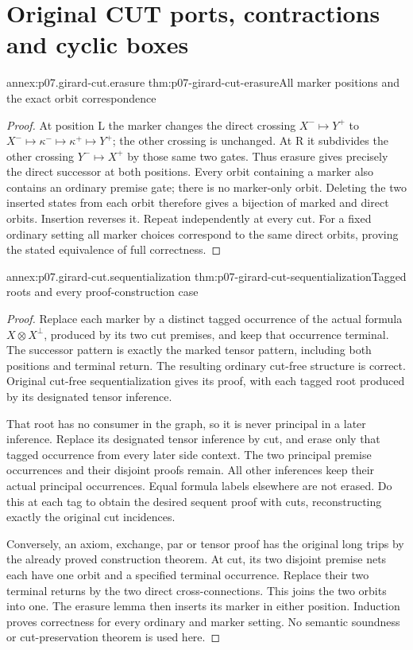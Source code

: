 \section{Original CUT ports, contractions and cyclic boxes}

\begin{annexitem}{annex:p07.girard-cut.erasure}
 {thm:p07-girard-cut-erasure}{All marker positions and the exact orbit correspondence}
\begin{proof}
At position L the marker changes the direct crossing \(X^-\mapsto Y^+\)
to \(X^-\mapsto\kappa^-\mapsto\kappa^+\mapsto Y^+\);
the other crossing is unchanged. At R it subdivides the other crossing
\(Y^-\mapsto X^+\) by those same two gates.
Thus erasure gives precisely the direct successor at both positions.
Every orbit containing a marker also contains an ordinary premise gate;
there is no marker-only orbit. Deleting the two inserted states from
each orbit therefore gives a bijection of marked and direct orbits.
Insertion reverses it. Repeat independently at every cut.
For a fixed ordinary setting all marker choices correspond to the
same direct orbits, proving the stated equivalence of full correctness.
\end{proof}
\end{annexitem}

\begin{annexitem}{annex:p07.girard-cut.sequentialization}
 {thm:p07-girard-cut-sequentialization}{Tagged roots and every proof-construction case}
\begin{proof}
Replace each marker by a distinct tagged occurrence of the actual
formula \(X\otimes X^\perp\), produced by its two cut premises,
and keep that occurrence terminal. The successor pattern is exactly
the marked tensor pattern, including both positions and terminal return.
The resulting ordinary cut-free structure is correct.
Original cut-free sequentialization gives its proof, with each tagged
root produced by its designated tensor inference.

That root has no consumer in the graph, so it is never principal in
a later inference. Replace its designated tensor inference by cut,
and erase only that tagged occurrence from every later side context.
The two principal premise occurrences and their disjoint proofs remain.
All other inferences keep their actual principal occurrences.
Equal formula labels elsewhere are not erased.
Do this at each tag to obtain the desired sequent proof with cuts,
reconstructing exactly the original cut incidences.

Conversely, an axiom, exchange, par or tensor proof has the original
long trips by the already proved construction theorem.
At cut, its two disjoint premise nets each have one orbit and a specified
terminal occurrence. Replace their two terminal returns by the two
direct cross-connections. This joins the two orbits into one.
The erasure lemma then inserts its marker in either position.
Induction proves correctness for every ordinary and marker setting.
No semantic soundness or cut-preservation theorem is used here.
\end{proof}
\end{annexitem}

